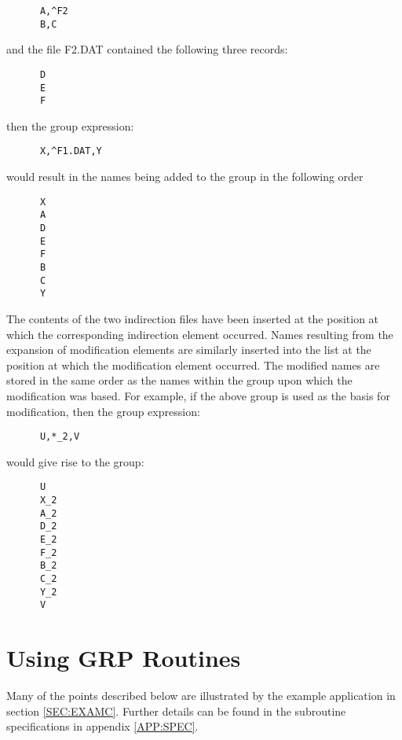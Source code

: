 \small
\begin{verbatim}
      A,^F2
      B,C
\end{verbatim}
\normalsize

and the file F2.DAT contained the following three records:

\small
\begin{verbatim}
      D
      E
      F
\end{verbatim}
\normalsize

then the group expression:

\small
\begin{verbatim}
      X,^F1.DAT,Y
\end{verbatim}
\normalsize

would result in the names being added to the group in the following order

\small
\begin{verbatim}
      X
      A
      D
      E
      F
      B
      C
      Y
\end{verbatim}
\normalsize

The contents of the two indirection files have been inserted at the position at
which the corresponding indirection element occurred. Names resulting from the
expansion of modification elements are similarly inserted into the list at the
position at which the modification element occurred. The modified names are
stored in the same order as the names within the group upon which the
modification was based. For example, if the above group is used as the basis for
modification, then the group expression:

\small
\begin{verbatim}
      U,*_2,V
\end{verbatim}
\normalsize

would give rise to the group:

\small
\begin{verbatim}
      U
      X_2
      A_2
      D_2
      E_2
      F_2
      B_2
      C_2
      Y_2
      V
\end{verbatim}
\normalsize


\section{Using GRP Routines}

Many of the points described below are illustrated by the example application in
section \ref{SEC:EXAMC}. Further details can be found in the subroutine
specifications in appendix \ref{APP:SPEC}.

